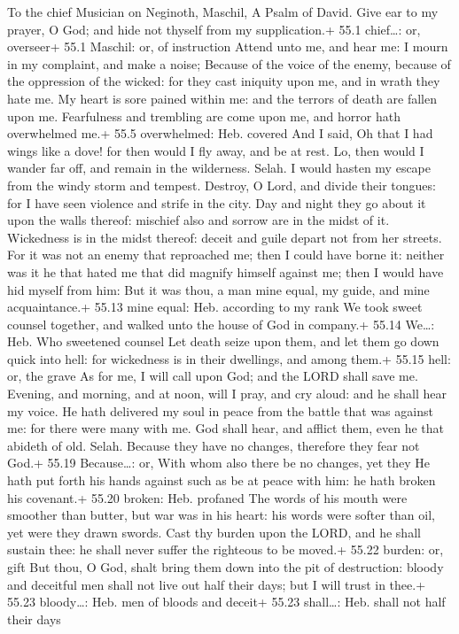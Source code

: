 To the chief Musician on Neginoth, Maschil, A Psalm of David.
 Give ear to my prayer, O God; and hide not thyself from my
supplication.+ 55.1 chief\ldots: or, overseer+ 55.1 Maschil: or, of
instruction  Attend unto me, and hear me: I mourn in my
complaint, and make a noise;  Because of the voice of the
enemy, because of the oppression of the wicked: for they cast iniquity
upon me, and in wrath they hate me.  My heart is sore pained
within me: and the terrors of death are fallen upon me. 
Fearfulness and trembling are come upon me, and horror hath overwhelmed
me.+ 55.5 overwhelmed: Heb. covered  And I said, Oh that I
had wings like a dove! for then would I fly away, and be at rest.
 Lo, then would I wander far off, and remain in the
wilderness. Selah.  I would hasten my escape from the windy
storm and tempest.  Destroy, O Lord, and divide their
tongues: for I have seen violence and strife in the city. 
Day and night they go about it upon the walls thereof: mischief also and
sorrow are in the midst of it.  Wickedness is in the midst
thereof: deceit and guile depart not from her streets.  For
it was not an enemy that reproached me; then I could have borne it:
neither was it he that hated me that did magnify himself against me;
then I would have hid myself from him:  But it was thou, a
man mine equal, my guide, and mine acquaintance.+ 55.13 mine equal: Heb.
according to my rank  We took sweet counsel together, and
walked unto the house of God in company.+ 55.14 We\ldots: Heb. Who
sweetened counsel  Let death seize upon them, and let them
go down quick into hell: for wickedness is in their dwellings, and among
them.+ 55.15 hell: or, the grave  As for me, I will call
upon God; and the LORD shall save me.  Evening, and
morning, and at noon, will I pray, and cry aloud: and he shall hear my
voice.  He hath delivered my soul in peace from the battle
that was against me: for there were many with me.  God
shall hear, and afflict them, even he that abideth of old. Selah.
Because they have no changes, therefore they fear not God.+ 55.19
Because\ldots: or, With whom also there be no changes, yet they
 He hath put forth his hands against such as be at peace
with him: he hath broken his covenant.+ 55.20 broken: Heb. profaned
 The words of his mouth were smoother than butter, but war
was in his heart: his words were softer than oil, yet were they drawn
swords.  Cast thy burden upon the LORD, and he shall
sustain thee: he shall never suffer the righteous to be moved.+ 55.22
burden: or, gift  But thou, O God, shalt bring them down
into the pit of destruction: bloody and deceitful men shall not live out
half their days; but I will trust in thee.+ 55.23 bloody\ldots: Heb. men
of bloods and deceit+ 55.23 shall\ldots: Heb. shall not half their days

